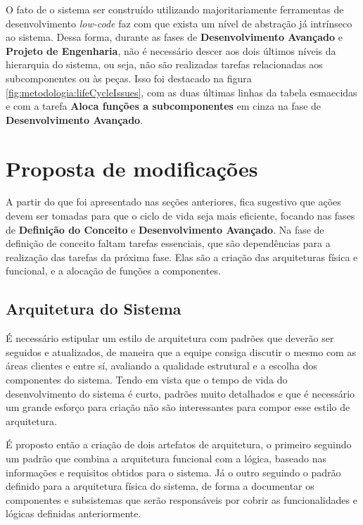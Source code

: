 	O fato de o sistema ser construído utilizando majoritariamente ferramentas de desenvolvimento \textit{low-code} faz com que exista um nível de abstração já intrínseco ao sistema.
	Dessa forma, durante as fases de \textbf{Desenvolvimento Avançado} e \textbf{Projeto de Engenharia}, não é necessário descer aos dois últimos níveis da hierarquia do sistema, ou seja,
	não são realizadas tarefas relacionadas aos subcomponentes ou às peças. Isso foi destacado na figura \ref{fig:metodologia:lifeCycleIssues}, com as duas últimas linhas da tabela esmaecidas
	e com a tarefa \textbf{Aloca funções a subcomponentes} em cinza na fase de \textbf{Desenvolvimento Avançado}.


	\section{Proposta de modificações}

	A partir do que foi apresentado nas seções anteriores, fica sugestivo que ações devem ser tomadas para que o ciclo de vida seja mais eficiente, focando nas fases de \textbf{Definição do Conceito} e
	\textbf{Desenvolvimento Avançado}.
	Na fase de definição de conceito faltam tarefas essenciais, que são dependências para a realização das tarefas da próxima fase. Elas são a criação das arquiteturas física e funcional, e a alocação de funções a componentes.
	
		
	\subsection{Arquitetura do Sistema}

	É necessário estipular um estilo de arquitetura com padrões que deverão ser seguidos e atualizados, de maneira que a equipe consiga 
	discutir o mesmo com as áreas clientes e entre sí, avaliando a qualidade estrutural e a escolha dos componentes do sistema. Tendo em vista que o tempo de vida do desenvolvimento
	do sistema é curto, padrões muito detalhados e que é necessário um grande esforço para criação não são interessantes para compor esse estilo de arquitetura.

	É proposto então a criação de dois artefatos de arquitetura, o primeiro seguindo um padrão que combina a arquitetura funcional com a lógica, baseado nas informações e requisitos obtidos
	para o sistema. Já o outro seguindo o padrão definido para a arquitetura física do sistema, de forma a documentar os componentes e subsistemas que serão responsáveis por cobrir as funcionalidades
	e lógicas definidas anteriormente.
	
